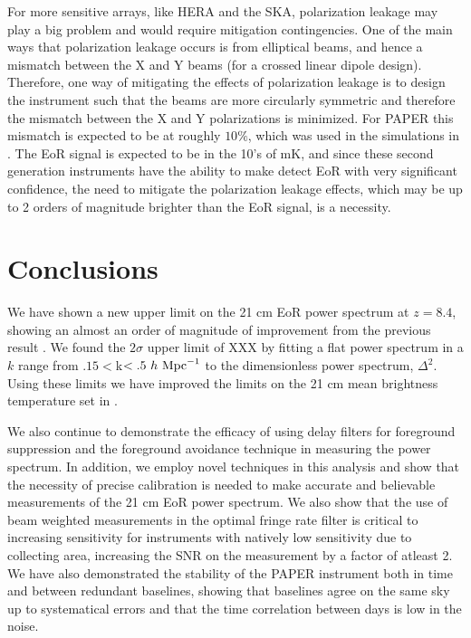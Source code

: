 \documentclass[twocolumn,numberedappendix]{emulateapj} \shorttitle{PSA64}
\begin{document}
For more sensitive arrays, like HERA and the SKA, polarization leakage may play
a big problem and would require mitigation contingencies. One of the main ways
that polarization leakage occurs is from elliptical beams, and hence a mismatch
between the X and Y beams (for a crossed linear dipole design). Therefore, one
way of mitigating the effects of polarization leakage is to design the
instrument such that the beams are more circularly symmetric and therefore the
mismatch between the X and Y polarizations is minimized. For PAPER this mismatch
is expected to be at roughly $10\%$, which was used in the simulations in
\cite{moore_et_al2013}.  The EoR signal is expected to be in the 10's of mK, and
since these second generation instruments have the ability to make detect EoR
with very significant confidence, the need to mitigate the polarization leakage
effects, which may be up to 2 orders of magnitude brighter than the EoR signal,
is a necessity.

\section{Conclusions}\label{sec:conclusion}
We have shown a new upper limit on the 21 cm EoR power spectrum at $z=8.4$,
showing an almost an order of magnitude of improvement from the previous result
\cite{parsons_et_al2014}. We found the $2\sigma$ upper limit of XXX by fitting a
flat power spectrum in a $k$ range from $.15<$k$<.5\ h\ {\rm Mpc}^{-1}$ to the
dimensionless power spectrum, $\Delta^{2}$. Using these limits we have improved
the limits on the 21 cm mean brightness temperature set in
\cite{parsons_et_al2014}.

We also continue to demonstrate the efficacy of using delay filters for
foreground suppression and the foreground avoidance technique in measuring the power
spectrum. In addition, we employ novel techniques in this analysis and show that
the necessity of precise calibration is needed to make accurate and believable
measurements of the 21 cm EoR power spectrum. We also show that the use of beam
weighted measurements in the optimal fringe rate filter is critical to
increasing sensitivity for instruments with natively low sensitivity due to
collecting area, increasing the SNR on the measurement by a factor of atleast 2.
We have also demonstrated the stability of the PAPER instrument both in time and
between redundant baselines, showing that baselines agree on the same sky up to
systematical errors and that the time correlation between days is low in the
noise.
\end{document}
